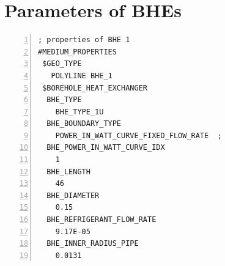 \section{Parameters of BHEs}
\label{sec:mmp_bhe_def}

\begin{Verbatim}[gobble=0, 
                 frame=single, 
                 label=Definition of BHE parameters in MMP File, 
                 numbers=left]
; properties of BHE 1 
#MEDIUM_PROPERTIES
 $GEO_TYPE
   POLYLINE BHE_1
 $BOREHOLE_HEAT_EXCHANGER
  BHE_TYPE
    BHE_TYPE_1U
  BHE_BOUNDARY_TYPE
    POWER_IN_WATT_CURVE_FIXED_FLOW_RATE  ; 
  BHE_POWER_IN_WATT_CURVE_IDX
    1
  BHE_LENGTH
    46
  BHE_DIAMETER
    0.15
  BHE_REFRIGERANT_FLOW_RATE
    9.17E-05
  BHE_INNER_RADIUS_PIPE
    0.0131
\end{Verbatim} 

